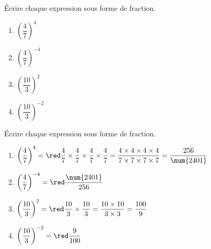 \begin{exercice*}
    Écrire chaque expression sous forme de fraction.
    \begin{spacing}{2}
        \begin{multicols}{2}
            \begin{enumerate}
                \item $\left(\dfrac{4}{7}\right)^4$
                \item $\left(\dfrac{4}{7}\right)^{-4}$
                \item $\left(\dfrac{10}{3}\right)^2$
                \item $\left(\dfrac{10}{3}\right)^{-2}$
            \end{enumerate}
        \end{multicols}
    \end{spacing}
\end{exercice*}
\begin{corrige}
    Écrire chaque expression sous forme de fraction.

    \begin{spacing}{2}
        \begin{enumerate}
            \item $\left(\dfrac{4}{7}\right)^4 =     {\red \dfrac{4}{7}\times \dfrac{4}{7}\times \dfrac{4}{7}\times \dfrac{4}{7} = \dfrac{4\times 4\times 4\times 4}{7\times 7\times 7\times 7}=\dfrac{256}{\num{2401}}}$
            \item $\left(\dfrac{4}{7}\right)^{-4} =  {\red \dfrac{\num{2401}}{256}}$
            \item $\left(\dfrac{10}{3}\right)^2 =    {\red \dfrac{10}{3}\times \dfrac{10}{3} = \dfrac{10\times 10}{3\times 3} = \dfrac{100}{9}}$
            \item $\left(\dfrac{10}{3}\right)^{-2} = {\red \dfrac{9}{100}}$
        \end{enumerate}
    \end{spacing}

\end{corrige}



